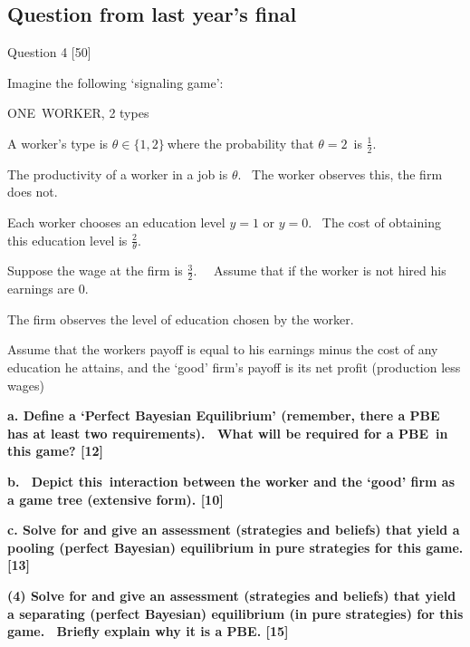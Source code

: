 \documentclass{article}
\begin{document}
\subsection{Question from last year's final}

{\Large Question 4 [50]}

Imagine the following `signaling game':

ONE\ WORKER, 2 types

A worker's type is $\theta \in \{1,2\}\ $where the probability that $\theta
=2$\ is $\frac{1}{2}$. \ 

The productivity of a worker in a job is $\theta $. \ The worker observes
this, the firm does not.

Each worker chooses an education level $y=1$ or $y=0$. \ The cost of
obtaining this education level is $\frac{2}{\theta }$.

Suppose the wage at the firm is $\frac{3}{2}$. \ \ Assume that if the worker
is not hired his earnings are $0$.

The firm observes the level of education chosen by the worker.

Assume that the workers payoff is equal to his earnings minus the cost of
any education he attains, and the `good' firm's payoff is its net profit
(production less wages)

\bigskip 

\textbf{a. Define a `Perfect Bayesian Equilibrium' (remember, there a PBE
has at least two requirements). \ What will be required for a PBE\ in this
game? [12]}

\bigskip 

\textbf{b. \ Depict this\ interaction between the worker and the `good' firm
as a game tree (extensive form). [10]}

\textbf{c. Solve for and give an assessment (strategies and beliefs) that
yield a pooling (perfect Bayesian) equilibrium in pure strategies for this
game. [13]}

\bigskip 

\textbf{(4) Solve for and give an assessment (strategies and beliefs) that
yield a separating (perfect Bayesian) equilibrium (in pure strategies) for
this game. \ Briefly explain why it is a PBE. [15]}

\bigskip 
\end{document}
